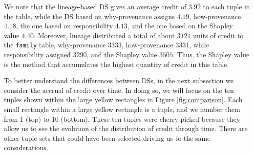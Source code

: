 \documentclass[preprint,12pt,sort&compress]{elsarticle}
\newcommand{\rone}[1]{\textcolor{reviewer1}{#1}}
\newcommand{\rtwo}[1]{\textcolor{reviewer2}{#1}}
\newcommand{\eat}[1]{}
\newcommand{\scream}[1]{{\bf * #1 *}{\typeout{#1}}}
\begin{document}
We note that the lineage-based DS gives an average credit of $3.92$ to each tuple in the table, while the DS based on why-provenance assigns $4.19$, how-provenance $4.18$, \rtwo{the one based on responsibility $4.13$, and the one based on the Shapley value $4.40$}. 
Moreover, lineage distributed a total of about $3121$ units of credit to the \texttt{family} table, why-provenance $3333$, how-provenance $3331$, while \rtwo{responsibility assigned $3290$, and the Shapley value $3505$. Thus, the Shapley value is the method that accumulates the highest quantity of credit in this table.} 


To better understand the differences between DSs, in the next subsection we consider the accrual of credit over time.  In doing so, we will focus on the ten tuples shown within the large yellow rectangles in Figure \ref{fig:comparison}.  Each small rectangle within a large yellow rectangle is a tuple, and we number them from $1$ (top) to $10$ (bottom). 
\rone{These ten tuples were cherry-picked because they allow us to see the evolution of the distribution of credit through time. There are other tuple sets that could have been selected driving us to the same considerations.}

\eat{
 Note that tuples 2, 7, 8, and 9 are awarded less credit than in either the lineage- or why-provenance strategies, whereas tuples 1 and 3 receives more credit than either of the other two strategies. 
 
However, the distribution does not reward tuple 2 in the same way. Also tuples 7, 8, and 9 that appear to be rewarded heavily in the why-provenance-based DS here are contain lower quantities of credit. Vice-versa, tuple 3 is much higher in credit with respect to what happens with the why-provenance-based DS.
This is due to the fact that this DS is even more sophisticated, since it uses all the information contained in the provenance polynomials. 
In this case, a tuple as 3 is able to attract even more credit than before. However, other tuples, such as 2, 7, 8, and 9 receive now less credit, since they role appears to be less determinant once the full information from the polynomials is taken into considerations. }
\eat{even more sophisticated, and can be taken into consideration when a user wants to distribute credit with a higher level of sensibility.}
\end{document}
